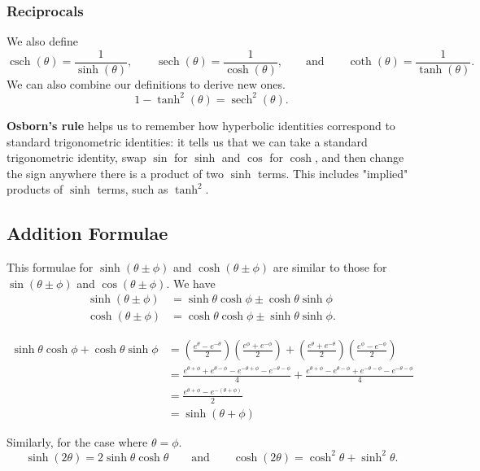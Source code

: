 \documentclass[10pt, a4paper]{article}
\DeclareMathOperator{\sech}{sech}
\DeclareMathOperator{\csch}{csch}
\begin{document}
\subsubsection{Reciprocals}
We also define
\[
\csch (\theta) = \frac{1}{\sinh (\theta)},\qquad\sech (\theta) = \frac{1}{\cosh (\theta)},\qquad\text{and}\qquad\coth (\theta) = \frac{1}{\tanh (\theta)}.
\]
We can also combine our definitions to derive new ones.
\[
1 - \tanh ^ 2 (\theta) = \sech ^ 2 (\theta).
\]

\textbf{Osborn's rule} helps us to remember how hyperbolic identities correspond to standard trigonometric identities: it tells us that we can take a standard trigonometric identity, swap $\sin$ for $\sinh$ and $\cos$ for $\cosh$, and then change the sign anywhere there is a product of two $\sinh$ terms. This includes "implied" products of $\sinh$ terms, such as $\tanh ^ 2$.

\subsection{Addition Formulae}
This formulae for $\sinh (\theta \pm \phi)$ and $\cosh (\theta \pm \phi)$ are similar to those for $\sin (\theta \pm \phi)$ and $\cos (\theta \pm \phi)$. We have
\begin{align*}
    \sinh (\theta \pm \phi) &= \sinh \theta \cosh \phi \pm \cosh \theta \sinh \phi \\
    \cosh (\theta \pm \phi) &= \cosh \theta \cosh \phi \pm \sinh \theta \sinh \phi.
\end{align*}

\begin{align*}
    \sinh \theta \cosh \phi + \cosh \theta \sinh \phi &= \left(\frac{e ^ \theta - e ^ {-\theta}}{2}\right)\left(\frac{e ^ \phi + e ^ {-\phi}}{2}\right) + \left(\frac{e ^ \theta + e ^ {-\theta}}{2}\right)\left(\frac{e ^ \phi - e ^ {-\phi}}{2}\right) \\
    &= \frac{e ^ {\theta + \phi} + e ^ {\theta - \phi} - e ^ {-\theta + \phi} - e ^ {-\theta -\phi}}{4} + \frac{e ^ {\theta + \phi} - e ^ {\theta - \phi} + e ^ {-\theta - \phi} - e ^ {-\theta -\phi}}{4} \\
    &= \frac{e ^ {\theta + \phi} - e ^ {-(\theta + \phi)}}{2} \\
    &= \sinh (\theta + \phi)
\end{align*}

Similarly, for the case where $\theta = \phi$.
\[
\sinh (2\theta) = 2\sinh\theta\cosh\theta\qquad\text{and}\qquad\cosh (2\theta) = \cosh ^ 2 \theta + \sinh ^ 2 \theta. 
\]
\end{document}
